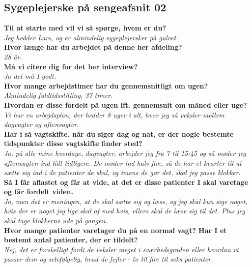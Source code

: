 \subsection{Sygeplejerske på sengeafsnit 02} \label{bilagO2}
\textbf{Til at starte med vil vi så spørge, hvem er du?}\\
\noindent
\textit{Jeg hedder Lars, og er almindelig sygeplejersker på gulvet.}\\
\noindent
\textbf{Hvor længe har du arbejdet på denne her afdeling?} \\
\noindent
\textit{28 år.}\\
\noindent
\textbf{Må vi citere dig for det her interview?}\\
\noindent
\textit{Ja det må I godt.}\\
\noindent
\textbf{Hvor mange arbejdstimer har du gennemsnitligt om ugen?}\\
\noindent
\textit{Almindelig fuldtidsstilling, 37 timer.}\\
\noindent
\textbf{Hvordan er disse fordelt på ugen ift. gennemsnit om måned eller uge?}\\
\noindent
\textit{Vi har en arbejdsplan, der hedder 8 uger i alt, hvor jeg så veksler mellem dagvagter og aftenvagter.}\\
\noindent
\textbf{Har i så vagtskifte, når du siger dag og nat, er der nogle bestemte tidspunkter disse vagtskifte finder sted?}\\
\noindent
\textit{Ja, på alle mine hverdage, dagvagter, arbejder jeg fra 7 til 15:45 og så møder jeg aftenvagten ind lidt tidligere. De møder ind halv fire, så de har et kvarter til at sætte sig ind i de patienter de skal, og imens de gør det, skal jeg passe klokker.}\\
\noindent
\textbf{Så I får aflastet og får at vide, at det er disse patienter I skal varetage og får fordelt viden.}\\
\noindent
\textit{Ja, men det er meningen, at de skal sætte sig og læse, og jeg skal kun sige noget, hvis der er noget jeg lige skal af med hvis, ellers skal de læse sig til det. Plus jeg skal tage klokkerne ude på gangen.}\\
\noindent
\textbf{Hvor mange patienter varetager du på en normal vagt? Har I et bestemt antal patienter, der er tildelt?}\\
\noindent
\textit{ Nej, det er forskelligt fordi de veksler meget i sværhedsgraden eller hvordan vi passer dem og selvfølgelig, hvad de fejler - to til fire til seks patienter.}\\
